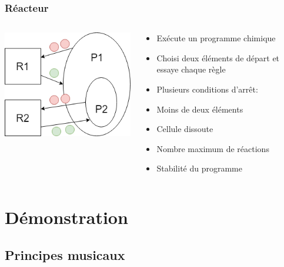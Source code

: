 \documentclass{beamer}
\begin{document}
\begin{frame}
\frametitle{Réacteur}
\begin{columns}

\begin{column}{5cm}
\begin{center}
\includegraphics[scale=0.45]{img/Reactor.png}
\end{center}
\end{column}

\begin{column}{7cm}
\begin{itemize}
    \item Exécute un programme chimique
    \item Choisi deux éléments de départ et essaye chaque règle
\end{itemize}
\pause
\begin{itemize}
    \item Plusieurs conditions d’arrêt:
    \item Moins de deux éléments
    \item Cellule dissoute
    \item Nombre maximum de réactions
    \item Stabilité du programme
\end{itemize}
\end{column}

\end{columns}
\end{frame}

\section{Démonstration}

\subsection{Principes musicaux}
\end{document}
